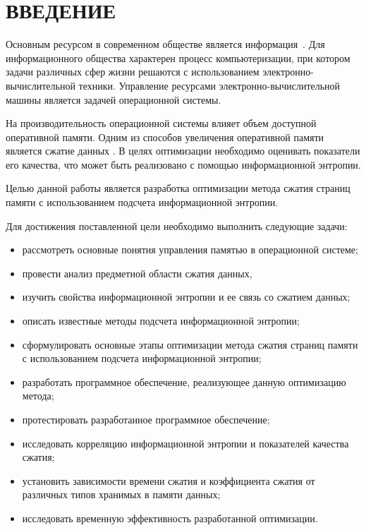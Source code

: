 \chapter*{ВВЕДЕНИЕ}

Основным ресурсом в современном обществе является информация~\cite{society}. Для информационного общества характерен процесс компьютеризации, при котором задачи различных сфер жизни решаются с использованием электронно-вычислительной техники. Управление ресурсами электронно-вычислительной машины является задачей операционной системы.

На производительность операционной системы влияет объем доступной оперативной памяти. Одним из способов увеличения оперативной памяти является сжатие данных \cite{swapping-problem}. В целях оптимизации необходимо оценивать показатели его качества, что может быть реализовано с помощью информационной энтропии.

Целью данной работы является разработка оптимизации метода сжатия страниц памяти с использованием подсчета информационной энтропии.

Для достижения поставленной цели необходимо выполнить следующие задачи:

\begin{itemize}
	\item рассмотреть основные понятия управления памятью в операционной системе;
	\item провести анализ предметной области сжатия данных, 
	\item изучить свойства информационной энтропии и ее связь со сжатием данных;
	\item описать известные методы подсчета информационной энтропии;
	\item сформулировать основные этапы оптимизации метода сжатия страниц памяти с использованием подсчета информационной энтропии;
    \item разработать программное обеспечение, реализующее данную оптимизацию метода;
    \item протестировать разработанное программное обеспечение;
    \item исследовать корреляцию информационной энтропии и показателей качества сжатия;
	\item установить зависимости времени сжатия и коэффициента сжатия от различных типов хранимых в памяти данных;
    \item исследовать временную эффективность разработанной оптимизации.
\end{itemize}